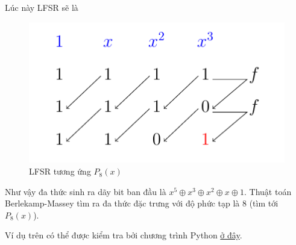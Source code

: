 \begin{example}
	Lúc này LFSR sẽ là
	
	\begin{figure}[htb]
		\centering
		\includegraphics[page=4]{figures/berlekamp_massey.pdf}
		\caption{LFSR tương ứng $P_8(x)$}
	\end{figure}

	Như vậy đa thức sinh ra dãy bit ban đầu là $x^5 \oplus x^3 \oplus x^2 \oplus x \oplus 1$. Thuật toán Berlekamp-Massey tìm ra đa thức đặc trưng với độ phức tạp là 8 (tìm tới $P_8(x)$).

\end{example}

Ví dụ trên có thể được kiểm tra bởi chương trình Python \href{https://github.com/dunglq2000/lfsr-berlekamp-massey}{ở đây}.